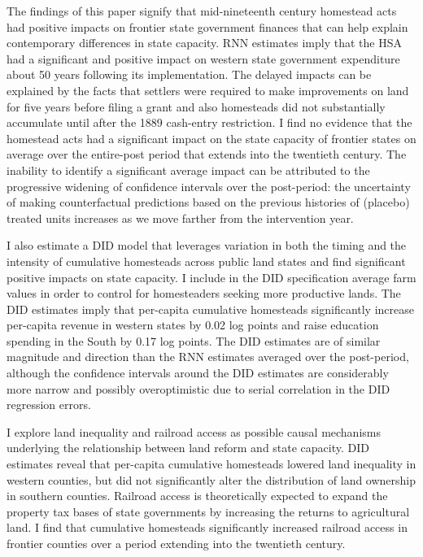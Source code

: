\documentclass[12pt]{article}
\begin{document}
The findings of this paper signify that mid-nineteenth century homestead acts had positive impacts on frontier state government finances that can help explain contemporary differences in state capacity. RNN estimates imply that the HSA had a significant and positive impact on western state government expenditure about 50 years following its implementation. The delayed impacts can be explained by the facts that settlers were required to make improvements on land for five years before filing a grant and also homesteads did not substantially accumulate until after the 1889 cash-entry restriction. I find no evidence that the homestead acts had a significant impact on the state capacity of frontier states on average over the entire-post period that extends into the twentieth century. The inability to identify a significant average impact can be attributed to the progressive widening of confidence intervals over the post-period: the uncertainty of making counterfactual predictions based on the previous histories of (placebo) treated units increases as we move farther from the intervention year. 

I also estimate a DID model that leverages variation in both the timing and the intensity of cumulative homesteads across public land states and find significant positive impacts on state capacity. I include in the DID specification average farm values in order to control for homesteaders seeking more productive lands. The DID estimates imply that per-capita cumulative homesteads significantly increase per-capita revenue in western states by 0.02 log points and raise education spending in the South by 0.17 log points. The DID estimates are of similar magnitude and direction than the RNN estimates averaged over the post-period, although the confidence intervals around the DID estimates are considerably more narrow and possibly overoptimistic due to serial correlation in the DID regression errors.

I explore land inequality and railroad access as possible causal mechanisms underlying the relationship between land reform and state capacity. DID estimates reveal that per-capita cumulative homesteads lowered land inequality in western counties, but did not significantly alter the distribution of land ownership in southern counties. Railroad access is theoretically expected to expand the property tax bases of state governments by increasing the returns to agricultural land. I find that cumulative homesteads significantly increased railroad access in frontier counties over a period extending into the twentieth century. 
\end{document}
